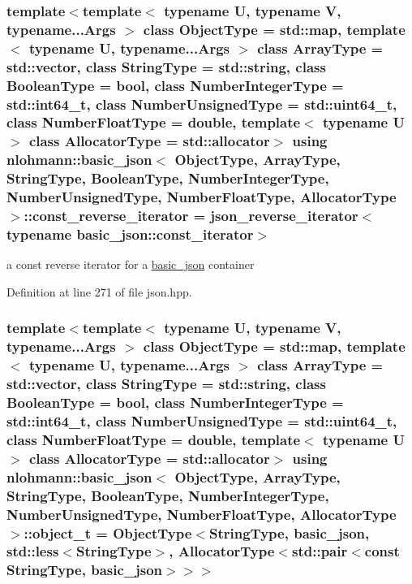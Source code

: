 \subsubsection[{const\+\_\+reverse\+\_\+iterator}]{\setlength{\rightskip}{0pt plus 5cm}template$<$template$<$ typename U, typename V, typename...\+Args $>$ class Object\+Type = std\+::map, template$<$ typename U, typename...\+Args $>$ class Array\+Type = std\+::vector, class String\+Type  = std\+::string, class Boolean\+Type  = bool, class Number\+Integer\+Type  = std\+::int64\+\_\+t, class Number\+Unsigned\+Type  = std\+::uint64\+\_\+t, class Number\+Float\+Type  = double, template$<$ typename U $>$ class Allocator\+Type = std\+::allocator$>$ using {\bf nlohmann\+::basic\+\_\+json}$<$ Object\+Type, Array\+Type, String\+Type, Boolean\+Type, Number\+Integer\+Type, Number\+Unsigned\+Type, Number\+Float\+Type, Allocator\+Type $>$\+::{\bf const\+\_\+reverse\+\_\+iterator} =  {\bf json\+\_\+reverse\+\_\+iterator}$<$typename {\bf basic\+\_\+json\+::const\+\_\+iterator}$>$}\label{classnlohmann_1_1basic__json_ae336fff01f4b78e3e16e5008dc8dbc00}


a const reverse iterator for a \hyperlink{classnlohmann_1_1basic__json}{basic\+\_\+json} container 



Definition at line 271 of file json.\+hpp.

\hypertarget{classnlohmann_1_1basic__json_a0ac9894c9de8dc551cf2e5f1c605537f}{}
\subsubsection[{object\+\_\+t}]{\setlength{\rightskip}{0pt plus 5cm}template$<$template$<$ typename U, typename V, typename...\+Args $>$ class Object\+Type = std\+::map, template$<$ typename U, typename...\+Args $>$ class Array\+Type = std\+::vector, class String\+Type  = std\+::string, class Boolean\+Type  = bool, class Number\+Integer\+Type  = std\+::int64\+\_\+t, class Number\+Unsigned\+Type  = std\+::uint64\+\_\+t, class Number\+Float\+Type  = double, template$<$ typename U $>$ class Allocator\+Type = std\+::allocator$>$ using {\bf nlohmann\+::basic\+\_\+json}$<$ Object\+Type, Array\+Type, String\+Type, Boolean\+Type, Number\+Integer\+Type, Number\+Unsigned\+Type, Number\+Float\+Type, Allocator\+Type $>$\+::{\bf object\+\_\+t} =  Object\+Type$<$String\+Type, {\bf basic\+\_\+json}, std\+::less$<$String\+Type$>$, Allocator\+Type$<$std\+::pair$<$const String\+Type, {\bf basic\+\_\+json}$>$$>$$>$}\label{classnlohmann_1_1basic__json_a0ac9894c9de8dc551cf2e5f1c605537f}


